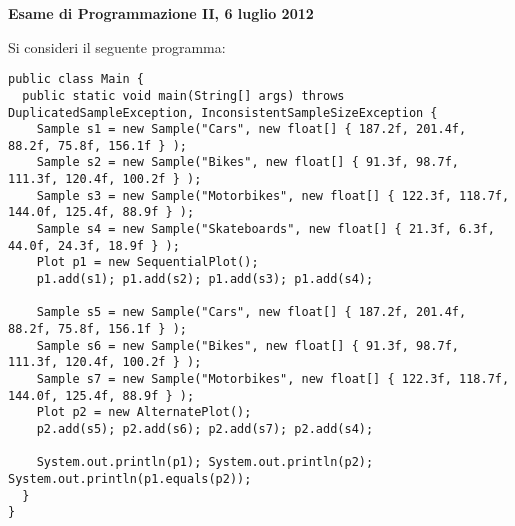 \documentclass{article}[10pt]
\begin{document}
\begin{center} {\bf Esame di Programmazione II, 6 luglio 2012}\end{center}

Si consideri il seguente programma:
%
{\small
\begin{verbatim}
public class Main {
  public static void main(String[] args) throws DuplicatedSampleException, InconsistentSampleSizeException {
    Sample s1 = new Sample("Cars", new float[] { 187.2f, 201.4f, 88.2f, 75.8f, 156.1f } );
    Sample s2 = new Sample("Bikes", new float[] { 91.3f, 98.7f, 111.3f, 120.4f, 100.2f } );		
    Sample s3 = new Sample("Motorbikes", new float[] { 122.3f, 118.7f, 144.0f, 125.4f, 88.9f } );		
    Sample s4 = new Sample("Skateboards", new float[] { 21.3f, 6.3f, 44.0f, 24.3f, 18.9f } );		
    Plot p1 = new SequentialPlot();
    p1.add(s1); p1.add(s2); p1.add(s3); p1.add(s4);

    Sample s5 = new Sample("Cars", new float[] { 187.2f, 201.4f, 88.2f, 75.8f, 156.1f } );
    Sample s6 = new Sample("Bikes", new float[] { 91.3f, 98.7f, 111.3f, 120.4f, 100.2f } );		
    Sample s7 = new Sample("Motorbikes", new float[] { 122.3f, 118.7f, 144.0f, 125.4f, 88.9f } );		
    Plot p2 = new AlternatePlot();
    p2.add(s5); p2.add(s6); p2.add(s7); p2.add(s4);

    System.out.println(p1); System.out.println(p2); System.out.println(p1.equals(p2));
  }
}
\end{verbatim}
}
\end{document}
